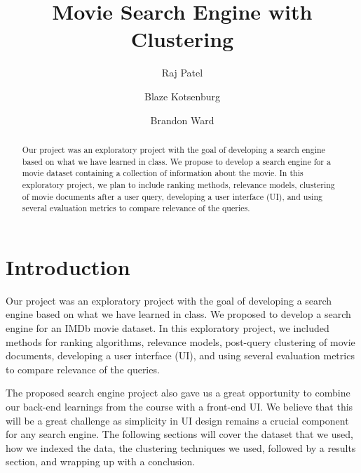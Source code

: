 \documentclass[sigconf]{acmart}
\begin{document}
\title{Movie Search Engine with Clustering}

\author{Raj Patel}

\author{Blaze Kotsenburg}

\author{Brandon Ward}

\begin{abstract}
Our project was an exploratory project with the goal of developing a search engine based on what we have learned in class. We propose to develop a search engine for a movie dataset containing a collection of information about the movie. In this exploratory project, we plan to include ranking methods, relevance models, clustering of movie documents after a user query, developing a user interface (UI), and using several evaluation metrics to compare relevance of the queries.
\end{abstract}


\maketitle

\section{Introduction}
Our project was an exploratory project with the goal of developing a search engine based on what we have learned in class. We proposed to develop a search engine for an IMDb movie dataset. In this exploratory project, we included methods for ranking algorithms, relevance models, post-query clustering of movie documents, developing a user interface (UI), and using several evaluation metrics to compare relevance of the queries.

The proposed search engine project also gave us a great opportunity to combine our back-end learnings from the course with a front-end UI. We believe that this will be a great challenge as simplicity in UI design remains a crucial component for any search engine. The following sections will cover the dataset that we used, how we indexed the data, the clustering techniques we used, followed by a results section, and wrapping up with a conclusion.
\end{document}
